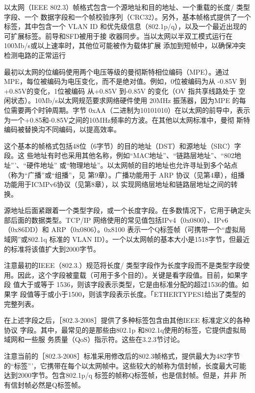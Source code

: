 以太网（IEEE 802.3）帧格式包含一个源地址和目的地址、一个重载的长度/ 类型字段、一个
数据字段和一个帧校验序列（CRC32）。另外，基本帧格式提供了一个标签，其中包含一个
VLAN ID 和优先级信息（802.1p/q），以及一个最近出现的可扩展标签。前导和SFD被用于接
收器同步。当以太网以半双工模式运行在100Mb/s或以上速率时，其他位可能被作为载体扩展
添加到短帧中，以确保冲突检测电路的正常运行

\begin{tcolorbox}
    最初以太网的位编码使用两个电压等级的曼彻斯特相位编码（MPE）。通过
    MPE，每位被编码为电压变化，而不是绝对值。例如，0位被编码为从 -0.85V 到
    +0.85V的变化，1位被编码 从+0.85V 到-0.85V 的变化（OV 指共享线路处于
    空闲状态）。10Mb/s以太网规范要求网络硬件使用 20MHz 振荡器，因为MPE 的每
    位需要两个时钟周期。字节 0xAA（二进制为10101010）在以太网的前导中，表示
    为一个+0.85和-0.85V之间的10MHz频率的方波。在其他以太网标准中，曼彻
    斯特编码被替换沟不同编码，以提高效率。
\end{tcolorbox}

这个基本的帧格式包括48位（6字节）的目的地址（DST）和源地址（SRC）字段。这
些地址有时也采用其他名称，例如“MAC地址”、“链路层地址”、“802地址”’、“硬件地址”
或“物理地址”。以太网帧的目的地址也允许寻址到多个站点（称为“广播”或“组播”，见
第9章）。广播功能用于 ARP 协议（见第4章），组播功能用于ICMPv6协议（见第8章），以
实现网络层地址和链路层地址之间的转换。

源地址后面紧跟着一个类型字段，或一个长度字段。在多数情况下，它用于确定头
部后面的数据类型。TCP/IP 网络使用的常见值包括IPv4（0x0800）、IPv6（0x86DD）和
ARP（0x0806）。0x8100 表示一个Q标签帧（可携带一个“虚拟局域网”或802.1q 标准的
VLAN ID）。一个以太网帧的基本大小是1518字节，但最近的标准将该值扩大到2000字节。

\begin{tcolorbox}
    注意最初的IEEE（802.3.）规范将长度/ 类型字段作为长度字段而不是类型字段使
    用。因此，这个字段被童载（可用于多个目的）。关键是看字段值。目前，如果字段
    值大于或等于 1536，则该字段表示类型，它是由标准分配的超过1536的值。如果字
    段值等于或小于1500，则该字段表示长度。「ETHERTYPES1给出了类型的完整列表。
\end{tcolorbox}

在上述字段之后，［802.3-2008］提供了多种标签包含由其他IEEE 标准定义的各种协议
字段。其中，最常见的是那些由802.1p 和802.1q使用的标签，它提供虚拟局域网和一些服
务质量（QoS）指示符。这些在3.2.3节讨论。

\begin{tcolorbox}
    注意当前的［802.3-2008］标准采用修改后的802.3帧格式，提供最大为482字节
    的“标签”'，它携带在每个以太网帧中。这些较大的帧称为信封帧，长度最大可能
    达到2000字节。包含802.1p/q 标签的帧称Q标签帧，也是信封帧。但是，并非
    所有信封帧必然是Q标签帧。
\end{tcolorbox}

